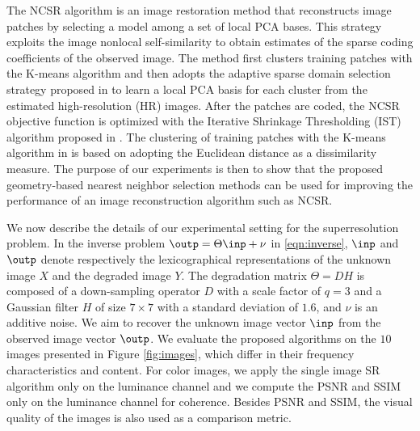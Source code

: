 \documentclass[journal]{IEEEtran}
\begin{document}
The NCSR algorithm \cite{Dong13nonlocally} is an image restoration method that reconstructs image patches by selecting a model among a set of local PCA bases. This strategy exploits the image nonlocal self-similarity to obtain estimates of the sparse coding coefficients of the observed image. The method first clusters training patches with the K-means algorithm and then adopts the adaptive sparse domain selection strategy proposed in \cite{Dong11image} to learn a local PCA basis for each cluster from the estimated high-resolution (HR) images. After the patches are coded, the NCSR objective function is optimized with the Iterative Shrinkage Thresholding (IST) algorithm proposed in \cite{Daubechies04an}. The clustering of training patches with the K-means algorithm in \cite{Dong13nonlocally} is based on adopting the Euclidean distance as a dissimilarity measure. The purpose of our experiments is then to show that the proposed geometry-based nearest neighbor selection methods can be used for improving the performance of an image reconstruction algorithm such as NCSR.



 

We now describe the details of our experimental setting for the superresolution problem. In the inverse problem $\outp=\Theta\inp+\nu$ in \eqref{eqn:inverse}, $\inp$ and $\outp$ denote respectively the lexicographical representations of the unknown image $X$ and the degraded image $Y$. The degradation matrix $\Theta=DH$ is composed of a down-sampling operator $D$ with a scale factor of $q=3$ and a Gaussian filter $H$ of size $7 \times 7$ with a standard deviation of $1.6$, and $\nu$ is an additive noise. We aim to recover the unknown image vector $\inp$ from the observed image vector $\outp$. We evaluate the proposed algorithms on the $10$ images presented in Figure \ref{fig:images}, which differ in their frequency characteristics and content. For color images, we apply the single image SR algorithm only on the luminance channel and we compute the PSNR and SSIM \cite{Wang04image} only on the luminance channel for coherence. Besides PSNR and SSIM, the visual quality of the images is also used as a comparison metric.
\end{document}
